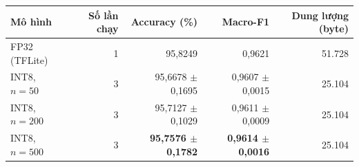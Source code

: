 \begin{tabular}{lrrrr}
\toprule
Mô hình & Số lần chạy & Accuracy (\%) & Macro-F1 & Dung lượng (byte) \\
\midrule
FP32 (TFLite) & 1 & 95,8249 & 0,9621 & 51.728 \\
INT8, $n=50$ & 3 & 95,6678 $\pm$ 0,1695 & 0,9607 $\pm$ 0,0015 & 25.104 \\
INT8, $n=200$ & 3 & 95,7127 $\pm$ 0,1029 & 0,9611 $\pm$ 0,0009 & 25.104 \\
INT8, $n=500$ & 3 & \textbf{95,7576 $\pm$ 0,1782} & \textbf{0,9614 $\pm$ 0,0016} & 25.104 \\
\bottomrule
\end{tabular}
